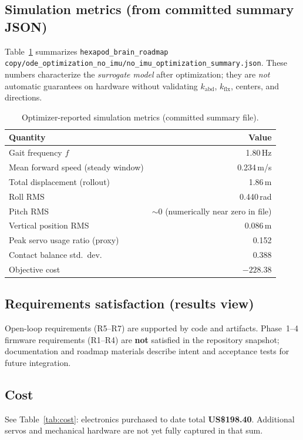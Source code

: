 \documentclass[11pt]{article}
\begin{document}
\subsection{Simulation metrics (from committed summary JSON)}
Table~\ref{tab:sim} summarizes \texttt{hexapod\_brain\_roadmap copy/ode\_optimization\_no\_imu/no\_imu\_optimization\_summary.json}. These numbers characterize the \emph{surrogate model} after optimization; they are \emph{not} automatic guarantees on hardware without validating $k_{\mathrm{abd}}$, $k_{\mathrm{flx}}$, centers, and directions.

\begin{table}[htbp]
  \centering
  \caption{Optimizer-reported simulation metrics (committed summary file).}
  \label{tab:sim}
  \begin{tabular}{@{}lr@{}}
    \toprule
    Quantity & Value \\
    \midrule
    Gait frequency $f$ & 1.80\,Hz \\
    Mean forward speed (steady window) & 0.234\,m/s \\
    Total displacement (rollout) & 1.86\,m \\
    Roll RMS & 0.440\,rad \\
    Pitch RMS & $\sim 0$ (numerically near zero in file) \\
    Vertical position RMS & 0.086\,m \\
    Peak servo usage ratio (proxy) & 0.152 \\
    Contact balance std.\ dev. & 0.388 \\
    Objective cost & $-228.38$ \\
    \bottomrule
  \end{tabular}
\end{table}

\subsection{Requirements satisfaction (results view)}
Open-loop requirements (R5--R7) are supported by code and artifacts. Phase~1--4 firmware requirements (R1--R4) are \textbf{not} satisfied in the repository snapshot; documentation and roadmap materials describe intent and acceptance tests for future integration.

\subsection{Cost}
See Table~\ref{tab:cost}: electronics purchased to date total \textbf{US\$198.40}. Additional servos and mechanical hardware are not yet fully captured in that sum.
\end{document}
